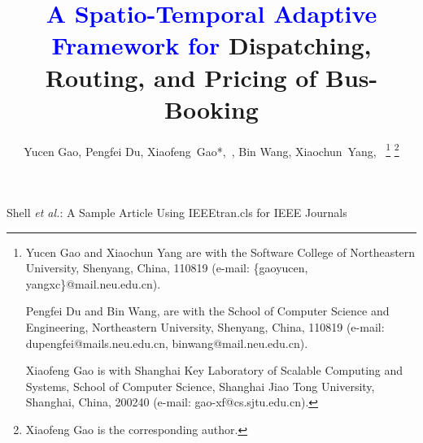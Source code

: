\documentclass[lettersize,journal]{IEEEtran}
\begin{document}
\title{\textcolor{blue}{A Spatio-Temporal Adaptive Framework for} Dispatching, Routing, and Pricing of Bus-Booking}

\author{Yucen Gao,
        Pengfei Du,
        Xiaofeng~Gao*,~, %
        Bin Wang,
        Xiaochun~Yang,~%
\thanks{Yucen Gao and Xiaochun Yang are with the Software College of Northeastern University, Shenyang, China, 110819 (e-mail: \{gaoyucen, yangxc\}@mail.neu.edu.cn).

Pengfei Du and Bin Wang, are with the School of Computer Science and Engineering, Northeastern University, Shenyang, China, 110819 (e-mail: dupengfei@mails.neu.edu.cn, binwang@mail.neu.edu.cn).

Xiaofeng Gao is with Shanghai Key Laboratory of Scalable Computing and Systems, School of Computer Science, Shanghai Jiao Tong University, Shanghai, China, 200240 (e-mail: gao-xf@cs.sjtu.edu.cn).
}
\thanks{Xiaofeng Gao is the corresponding author.}
}

%
{Shell \MakeLowercase{\textit{et al.}}: A Sample Article Using IEEEtran.cls for IEEE Journals}


\maketitle
\end{document}
